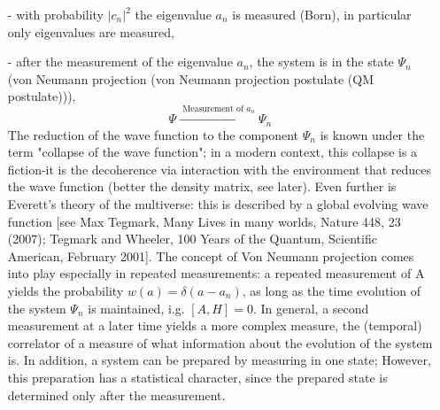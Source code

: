\begin{enumerate}
    \item[-] with probability $| c_n|^2$ the eigenvalue $a_n$ is measured (Born), in particular only eigenvalues ​​are measured,
    \item[-] after the measurement of the eigenvalue $a_n$, the system is in the state $\Psi_n$ (von Neumann projection (von Neumann projection postulate (QM postulate))),
    \begin{equation}
        \Psi \stackrel{\text { Measurement of } a_{n}}{\longrightarrow} \Psi_{n}
    \end{equation}
    The reduction of the wave function to the component $\Psi_n$ is known under the term "collapse of the wave function"; in a modern context, this collapse is a fiction-it is the decoherence via interaction with the environment that reduces the wave function (better the density matrix, see later). Even further is Everett's theory of the multiverse: this is described by a global evolving wave function [see Max Tegmark, Many Lives in many worlds, Nature 448, 23 (2007); Tegmark and Wheeler, 100 Years of the Quantum, Scientific American, February 2001]. The concept of Von Neumann projection comes into play especially in repeated measurements: a repeated measurement of A yields the probability $w (a) =\delta(a-a_n)$, as long as the time evolution of the system $\Psi_n$ is maintained, i.g. $[A, H] = 0$. In general, a second measurement at a later time yields a more complex measure, the (temporal) correlator of a measure of what information about the evolution of the system is. In addition, a system can be prepared by measuring in one state; However, this preparation has a statistical character, since the prepared state is determined only after the measurement.
\end{enumerate}
